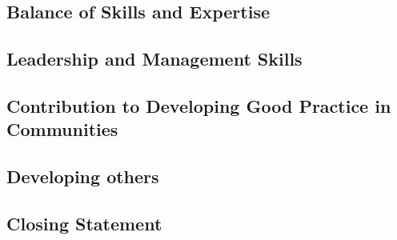 \subsection*{Balance of Skills and Expertise}

\subsection*{Leadership and Management Skills}

\subsection*{Contribution to Developing Good Practice in Communities}

\subsection*{Developing others}

\subsection*{Closing Statement}

